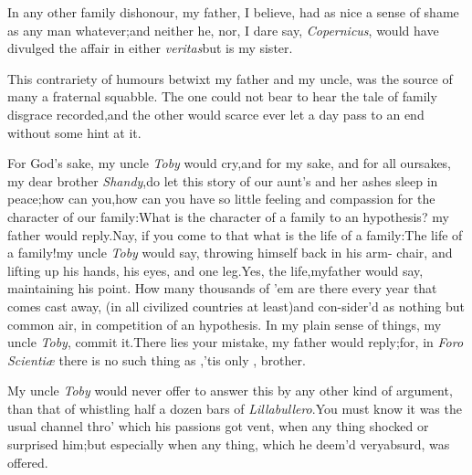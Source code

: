 \documentclass{article}
\begin{document}
In any other family dishonour, my father, I believe, had as nice
a sense of shame as any man whatever;\tsh and neither he,
nor, I dare say, \textit{Copernicus}, would have divulged the affair
in either 
\textit{veritas}\tsk but  is my sister.

This contrariety of humours betwixt my father and my uncle, was
the source of many a fraternal squabble. The one could not bear to
hear the tale of family disgrace recorded,\tsh and the
other would scarce ever let a day pass to an end without some hint
at it.

For God’s sake, my uncle \textit{Toby} would
cry,\tsh and for my sake, and for all our\break sakes, my dear
brother \textit{Shandy},\tsk do let this story of our aunt’s
and her ashes sleep in peace;\tsk how can
you,\tsh\break how can you have so little feeling and compassion
for the character of our fa\-mily:\tsh What is the character
of a fa\-mily to an hypothesis? my father would\break
reply.\tsh Nay, if you come to that\tsk
\break what is the
life of a family:\tsh The life of a family!\tsk my uncle
\textit{Toby} would say, throwing himself back in his arm-
chair, and
lifting up his hands, his eyes, and one
leg.\tsh Yes, the life,\tsh my\break father would say,
maintaining his point. How many thousands of ’em are there
every year that comes cast away, (in all civilized countries at
least)\tsh and con-\break sider’d as nothing but common air, in
competition of an hypothesis. In my plain sense of things, my uncle
\textit{Toby},\break 
{}
commit it.\tsh There
lies your mistake, my father would reply;\tsh for, in
\textit{Foro Scientiæ} there is no such thing as
,\tsh ’tis only
, brother.

My uncle \textit{Toby} would never offer to answer this by any
other kind of argument, than that of whistling half a dozen bars of
\textit{Lillabullero}.\tsh You must know it was the usual
channel thro’ which his passions got vent, when any thing
shock\-ed or surprised him;\tsh but especially when any
thing, which he deem’d very\break absurd, was offered.
\end{document}
